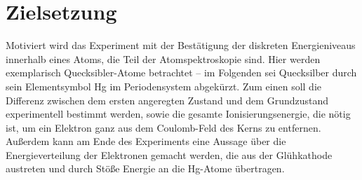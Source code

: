 \section{Zielsetzung}
\label{sec:Zielsetzung}

Motiviert wird das Experiment mit der Bestätigung der diskreten Energieniveaus innerhalb eines Atoms, die Teil der Atomspektroskopie sind.  
Hier werden exemplarisch Quecksibler-Atome betrachtet -- im Folgenden sei Quecksilber durch sein Elementsymbol Hg im Periodensystem abgekürzt. 
Zum einen soll die Differenz zwischen dem ersten angeregten Zustand und dem Grundzustand experimentell bestimmt werden, 
sowie die gesamte Ionisierungsenergie, die nötig ist, um ein Elektron ganz aus dem Coulomb-Feld des Kerns zu entfernen. 
Außerdem kann am Ende des Experiments eine Aussage über die Energieverteilung der Elektronen gemacht werden, die 
aus der Glühkathode austreten und durch Stöße Energie an die Hg-Atome übertragen. 